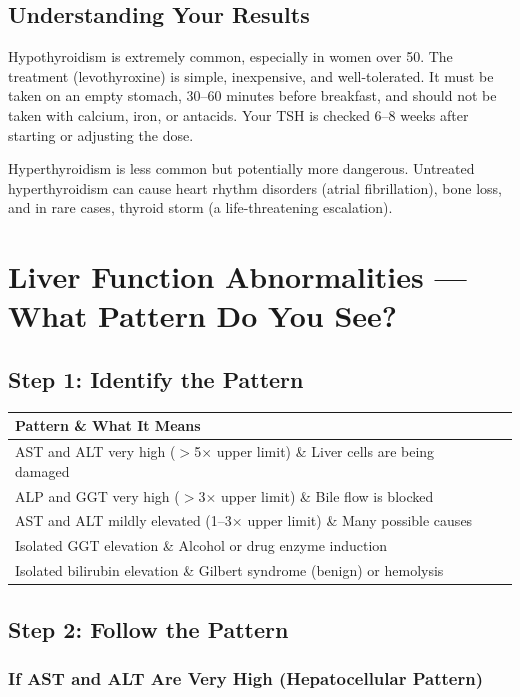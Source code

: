 \subsection{Understanding Your Results}

Hypothyroidism is extremely common, especially in women over 50. The treatment (levothyroxine) is simple, inexpensive, and well-tolerated. It must be taken on an empty stomach, 30--60 minutes before breakfast, and should not be taken with calcium, iron, or antacids. Your TSH is checked 6--8 weeks after starting or adjusting the dose.

Hyperthyroidism is less common but potentially more dangerous. Untreated hyperthyroidism can cause heart rhythm disorders (atrial fibrillation), bone loss, and in rare cases, thyroid storm (a life-threatening escalation).

\clearpage
\section{Liver Function Abnormalities --- What Pattern Do You See?}

\subsection{Step 1: Identify the Pattern}

\begin{longtable}{@{}ll@{}}
\toprule
\textbf{Pattern} \& \textbf{What It Means} \\
\midrule
AST and ALT very high ($>$5$\times$ upper limit) \& Liver cells are being damaged \\
ALP and GGT very high ($>$3$\times$ upper limit) \& Bile flow is blocked \\
AST and ALT mildly elevated (1--3$\times$ upper limit) \& Many possible causes \\
Isolated GGT elevation \& Alcohol or drug enzyme induction \\
Isolated bilirubin elevation \& Gilbert syndrome (benign) or hemolysis \\
\bottomrule
\end{longtable}

\subsection{Step 2: Follow the Pattern}

\subsubsection{If AST and ALT Are Very High (Hepatocellular Pattern)}


